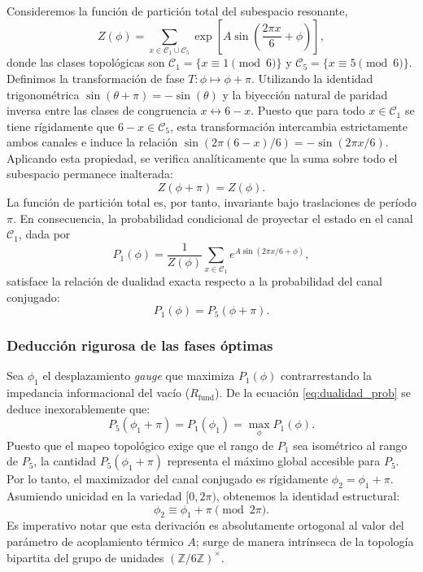 \documentclass[12pt,a4paper]{article}
\theoremstyle{plain}
\theoremstyle{definition}
\theoremstyle{remark}
\begin{document}
Consideremos la función de partición total del subespacio resonante,
\begin{equation}
Z(\phi) = \sum_{x \in \mathcal{C}_1 \cup \mathcal{C}_5} \exp\left[A \sin\left(\frac{2\pi x}{6} + \phi\right)\right],
\end{equation}
donde las clases topológicas son $\mathcal{C}_1 = \{x \equiv 1 \pmod{6}\}$ y $\mathcal{C}_5 = \{x \equiv 5 \pmod{6}\}$. Definimos la transformación de fase $T: \phi \mapsto \phi + \pi$. Utilizando la identidad trigonométrica $\sin(\theta+\pi) = -\sin(\theta)$ y la biyección natural de paridad inversa entre las clases de congruencia $x \leftrightarrow 6-x$. Puesto que para todo $x \in \mathcal{C}_1$ se tiene rígidamente que $6-x \in \mathcal{C}_5$, esta transformación intercambia estrictamente ambos canales e induce la relación $\sin(2\pi(6-x)/6) = -\sin(2\pi x/6)$. Aplicando esta propiedad, se verifica analíticamente que la suma sobre todo el subespacio permanece inalterada:
\begin{equation}
Z(\phi + \pi) = Z(\phi).
\label{eq:periodicidad_Z}
\end{equation}
La función de partición total es, por tanto, invariante bajo traslaciones de período $\pi$. En consecuencia, la probabilidad condicional de proyectar el estado en el canal $\mathcal{C}_1$, dada por
\begin{equation}
P_1(\phi) = \frac{1}{Z(\phi)}\sum_{x\in\mathcal{C}_1} e^{A\sin(2\pi x/6 + \phi)},
\end{equation}
satisface la relación de dualidad exacta respecto a la probabilidad del canal conjugado:
\begin{equation}
P_1(\phi) = P_5(\phi+\pi).
\label{eq:dualidad_prob}
\end{equation}

\subsubsection*{Deducción rigurosa de las fases óptimas}

Sea $\phi_1$ el desplazamiento \textit{gauge} que maximiza $P_1(\phi)$ contrarrestando la impedancia informacional del vacío ($R_{\text{fund}}$). De la ecuación \eqref{eq:dualidad_prob} se deduce inexorablemente que:
\begin{equation}
P_5(\phi_1+\pi) = P_1(\phi_1) = \max_{\phi} P_1(\phi).
\end{equation}
Puesto que el mapeo topológico exige que el rango de $P_1$ sea isométrico al rango de $P_5$, la cantidad $P_5(\phi_1+\pi)$ representa el máximo global accesible para $P_5$. Por lo tanto, el maximizador del canal conjugado es rígidamente $\phi_2 = \phi_1 + \pi$. Asumiendo unicidad en la variedad $[0, 2\pi)$, obtenemos la identidad estructural:
\begin{equation}
\phi_2 \equiv \phi_1 + \pi \pmod{2\pi}.
\label{eq:relacion_fases}
\end{equation}
Es imperativo notar que esta derivación es absolutamente ortogonal al valor del parámetro de acoplamiento térmico $A$; surge de manera intrínseca de la topología bipartita del grupo de unidades $(\mathbb{Z}/6\mathbb{Z})^{\times}$.
\end{document}
